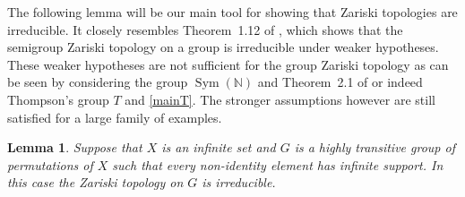 \documentclass[11pt]{amsart}
\newtheorem{lemma}[theorem]{Lemma}
\newcommand{\N}{\mathbb N}
\begin{document}
The following lemma will be our main tool for showing that Zariski topologies are irreducible.
It closely resembles Theorem~1.12 of \cite{bardyla2025note}, which shows that the semigroup Zariski topology on a group is irreducible under weaker hypotheses. 
These weaker hypotheses are not sufficient for the group Zariski topology as can be seen by considering the group \(\operatorname{Sym}(\N)\) and Theorem~2.1 of \cite{banakh2012algebraically} or indeed Thompson's group \(T\) and \cref{mainT}. 
The stronger assumptions however are still satisfied for a large family of examples.

\begin{lemma}\label{main}
    Suppose that \(X\) is an infinite set and \(G\) is a highly transitive group of permutations of \(X\) such that every non-identity element has infinite support.
    In this case the Zariski topology on \(G\) is irreducible.
\end{lemma}
\end{document}
